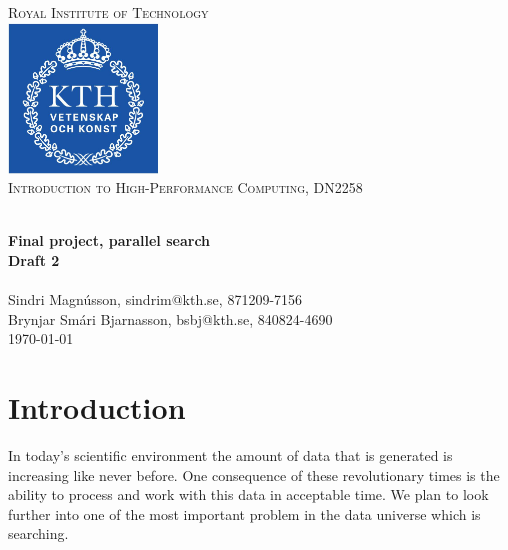 \documentclass[a4paper,10pt]{article}
\title{}
\author{}
\begin{document}
\begin{titlepage}
\begin{center}


\textsc{\LARGE Royal Institute of Technology}\\[1.5cm]

\includegraphics[width=0.3\textwidth]{kth_mathematics_rgb.jpg}\\[1cm]

\textsc{\Large Introduction to High-Performance Computing, DN2258 }  %

\hrulefill \\[0.4cm]
{ \huge \bfseries Final project, parallel search\\ Draft 2}\\[0.4cm]
\hrulefill \\[1.5cm]


Sindri Magnússon, sindrim@kth.se, 871209-7156 \\
Brynjar Smári Bjarnasson, bsbj@kth.se, 840824-4690 \\


\vfill
{\large \today}

\end{center}
\end{titlepage}


\cleardoublepage
\tableofcontents
\newpage

\section{Introduction}

In today's scientific environment the amount of data that is generated is increasing like never before.  
One consequence of these revolutionary times is the ability to process 
and work with this data in acceptable time.  
We plan to look further into one of the most important problem in the data universe which is searching.  
\end{document}
